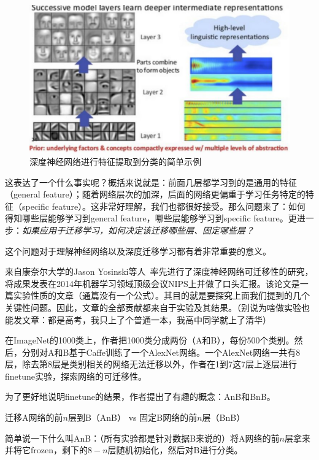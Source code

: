 \begin{figure}[htbp]
	\centering
	\includegraphics[scale=0.5]{./figures/fig-whydeep.pdf}
	\caption{深度神经网络进行特征提取到分类的简单示例}
	\label{fig-whydeep}
\end{figure}

这表达了一个什么事实呢？概括来说就是：前面几层都学习到的是通用的特征（general feature）；随着网络层次的加深，后面的网络更偏重于学习任务特定的特征（specific feature）。这非常好理解，我们也都很好接受。那么问题来了：如何得知哪些层能够学习到general feature，哪些层能够学习到specific feature。更进一步：\textit{如果应用于迁移学习，如何决定该迁移哪些层、固定哪些层？}

这个问题对于理解神经网络以及深度迁移学习都有着非常重要的意义。

来自康奈尔大学的Jason Yosinski等人~\cite{yosinski2014transferable}率先进行了深度神经网络可迁移性的研究，将成果发表在2014年机器学习领域顶级会议NIPS上并做了口头汇报。该论文是一篇实验性质的文章（通篇没有一个公式）。其目的就是要探究上面我们提到的几个关键性问题。因此，文章的全部贡献都来自于实验及其结果。（别说为啥做实验也能发文章：都是高考，我只上了个普通一本，我高中同学就上了清华）

在ImageNet的1000类上，作者把1000类分成两份（A和B），每份500个类别。然后，分别对A和B基于Caffe训练了一个AlexNet网络。一个AlexNet网络一共有8层，除去第8层是类别相关的网络无法迁移以外，作者在1到7这7层上逐层进行finetune实验，探索网络的可迁移性。

为了更好地说明finetune的结果，作者提出了有趣的概念：AnB和BnB。

迁移A网络的前$n$层到B（AnB） vs 固定B网络的前$n$层（BnB）

简单说一下什么叫AnB：（所有实验都是针对数据B来说的）将A网络的前$n$层拿来并将它frozen，剩下的$8-n$层随机初始化，然后对B进行分类。

